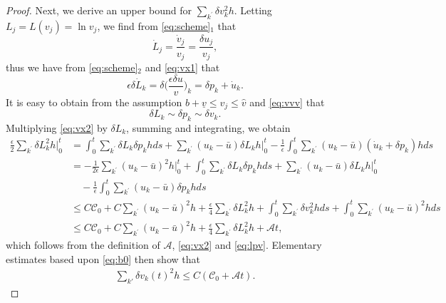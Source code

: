 \documentclass[10pt,a4paper]{amsart}
\begin{document}
\begin{proof}
Next, we derive an upper bound for \(\sum\limits_{k^{\prime}}\delta v_{k}^{2}h\).
Letting \(L_j=L(v_j)=\ln v_j\), we find from \eqref{eq:scheme}$_1$ that
\begin{equation}\label{eq:vx1}
  \dot{L}_{j}=\frac{\dot v_{j}}{v_{j}}=\frac{\delta u_{j}}{v_{j}},
\end{equation}
thus we have from \eqref{eq:scheme}$_2$ and \eqref{eq:vx1} that
\begin{equation}\label{eq:vx2}
  \epsilon\delta\dot{L}_{k}=\delta\Big(\frac{\epsilon\delta u}{v}\Big)_{k}=\delta p_k+\dot{u}_k.
\end{equation}
It is easy to obtain from the assumption $b+\underline{v}\leq v_j\leq \hat{v}$ and \eqref{eq:vvv} that
\begin{equation}\label{eq:lpv}
	\delta L_k\sim\delta p_{k}\sim\delta v_{k}.
\end{equation}
Multiplying \eqref{eq:vx2} by \(\delta L_{k}\), summing and integrating, we obtain
\begin{equation*}
\begin{aligned}\frac\epsilon2\sum_{k^{\prime}}\delta L_{k}^{2}h\Big|_{0}^{t}&=\int_{0}^{t}\sum_{k^{'}}\delta L_{k}\delta p_{k}hds+\sum_{k^{'}}(u_k-\bar u)\delta L_{k}h\Big|_{0}^{t}%
-\frac1\epsilon\int_{0}^{t}\sum_{k^{'}} (u_k-\bar u)(\dot{u}_{k}+\delta p_{k})hds\\&
=-\frac1{2\epsilon}\sum_{k^{\prime}} (u_k-\bar u)^{2}h\Big|_{0}^{t}+\int_{0}^{t}\sum_{k^{'}}\delta L_{k}\delta p_{k}hds+\sum_{k^{'}}(u_k-\bar u)\delta L_{k}h\Big|_{0}^{t}\\&\quad
-\frac1\epsilon\int_{0}^{t}\sum_{k^{'}} (u_k-\bar u)\delta p_{k}hds\\
&\leq C\mathscr{C}_{0}+C\sum_{k^{\prime}} (u_k-\bar u)^{2}h+\frac\epsilon4\sum_{k^{\prime}}\!\delta L_{k}^{2}h+\int_{0}^{t}\!\sum_{k^{'}}\!\delta v_{k}^{2}hds+\int_{0}^{t}\!\sum_{k^{'}}(u_{k}\!-\!\bar u)^{2}hds\\
&\leq C\mathscr{C}_{0}+C\sum_{k^{\prime}} (u_k-\bar u)^{2}h+\frac\epsilon4\sum_{k^{\prime}}\!\delta L_{k}^{2}h+\mathscr{A}t,\end{aligned}  
\end{equation*}
which follows from the definition of $\mathscr{A}$, \eqref{eq:vx2} and \eqref{eq:lpv}. Elementary estimates based upon \eqref{eq:b0} then show that
\begin{equation}\label{eq:vx0}
\begin{aligned}\sum_{k'}\delta v_{k}(t)^{2}h\leq C(\mathscr{C}_{0}+\mathscr{A}t).\end{aligned}  

\end{equation}
\end{proof}
\end{document}
